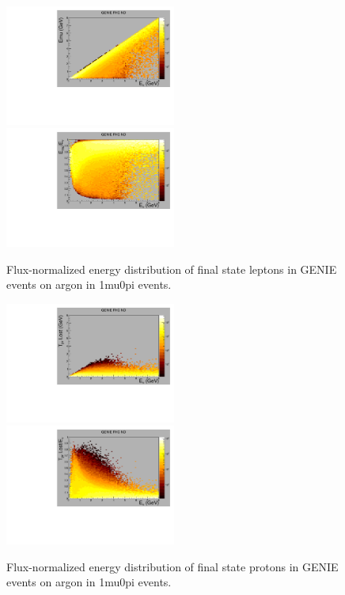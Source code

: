 \documentclass{article}
\begin{document}
\begin{figure}[!h]
  \includegraphics[width=0.5\textwidth]{plots.old/fig1.pdf}
  \includegraphics[width=0.5\textwidth]{plots.old/fig2.pdf}
  \caption{Flux-normalized energy distribution of final state leptons in GENIE events on argon in 1mu0pi events.}
\end{figure}

\begin{figure}[!h]
  \includegraphics[width=0.5\textwidth]{plots.old/fig3.pdf}
  \includegraphics[width=0.5\textwidth]{plots.old/fig4.pdf}
  \caption{Flux-normalized energy distribution of final state protons in GENIE events on argon in 1mu0pi events.}
\end{figure}
\end{document}
